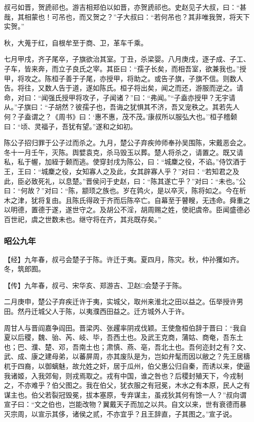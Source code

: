 \documentclass[]{article}
\begin{document}
叔弓如晋，贺虒祁也。游吉相郑伯以如晋，亦贺虒祁也。史赵见子大叔，曰：``甚哉，其相蒙也！可吊也，而又贺之？''子大叔曰：``若何吊也？其非唯我贺，将天下实贺。''

秋，大蒐于红，自根牟至于商、卫，革车千乘。

七月甲戌，齐子尾卒，子旗欲治其室。丁丑，杀梁婴。八月庚戌，逐子成、子工、子车，皆来奔，而立子良氏之宰。其臣曰：``孺子长矣，而相吾室，欲兼我也。''授甲，将攻之。陈桓子善于子尾，亦授甲，将助之。或告子旗，子旗不信。则数人告。将往，又数人告于道，遂如陈氏。桓子将出矣，闻之而还，游服而逆之。请命，对曰：``闻强氏授甲将攻子，子闻诸？''曰：``弗闻。''``子盍亦授甲？无宇请从。''子旗曰：``子胡然？彼孺子也，吾诲之犹惧其不济，吾又宠秩之。其若先人何？子盍谓之？《周书》曰：`惠不惠，茂不茂。'康叔所以服弘大也。''桓子稽颡曰：``顷、灵福子，吾犹有望。''遂和之如初。

陈公子招归罪于公子过而杀之。九月，楚公子弃疾帅师奉孙吴围陈，宋戴恶会之。冬十一月壬午，灭陈。舆嬖袁克，杀马毁玉以葬。楚人将杀之，请置之。既又请私，私于幄，加絰于颡而逃。使穿封戌为陈公，曰：``城麇之役，不谄。''侍饮酒于王，王曰：``城麇之役，女知寡人之及此，女其辟寡人乎？''对曰：``若知君之及此，臣必致死礼，以息楚。''晋侯问于史赵，曰：``陈其遂亡乎？''对曰：``未也。''公曰：``何故？''对曰：``陈，颛顼之族也。岁在鹑火，是以卒灭，陈将如之。今在析木之津，犹将复由。且陈氏得政于齐而后陈卒亡。自幕至于瞽瞍，无违命。舜重之以明德，置德于遂，遂世守之。及胡公不淫，胡周赐之姓，使祀虞帝。臣闻盛德必百世祀，虞之世数未也。继守将在齐，其兆既存矣。''

\hypertarget{header-n2514}{%
\subsubsection{昭公九年}\label{header-n2514}}

【经】九年春，叔弓会楚子于陈。许迁于夷。夏四月，陈灾。秋，仲孙玃如齐。冬，筑郎囿。

【传】九年春，叔弓、宋华亥、郑游吉、卫赵□会楚子于陈。

二月庚申，楚公子弃疾迁许于夷，实城父，取州来淮北之田以益之。伍举授许男田。然丹迁城父人于陈，以夷濮西田益之。迁方城外人于许。

周甘人与晋阎嘉争阎田。晋梁丙、张趯率阴戎伐颖。王使詹桓伯辞于晋曰：``我自夏以后稷，魏、骀、芮、岐、毕，吾西土也。及武王克商，蒲姑、商奄，吾东土也；巴、濮、楚、邓，吾南土也；肃慎、燕、亳，吾北土也。吾何迩封之有？文、武、成、康之建母弟，以蕃屏周，亦其废队是为，岂如弁髦而因以敝之？先王居檮杌于四裔，以御螭魅，故允姓之奸，居于瓜州，伯父惠公归自秦，而诱以来，使逼我诸姬，入我郊甸，则戎焉取之。戎有中国，谁之咎也？后稷封殖天下，今戎制之，不亦难乎？伯父图之。我在伯父，犹衣服之有冠冕，木水之有本原，民人之有谋主也。伯父若裂冠毁冕，拔本塞原，专弃谋主，虽戎狄其何有馀一人？''叔向谓宣子曰：``文之伯也，岂能改物？翼戴天子而加之以共。自文以来，世有衰德而暴灭宗周，以宣示其侈，诸侯之贰，不亦宜乎？且王辞直，子其图之。''宣子说。
\end{document}
